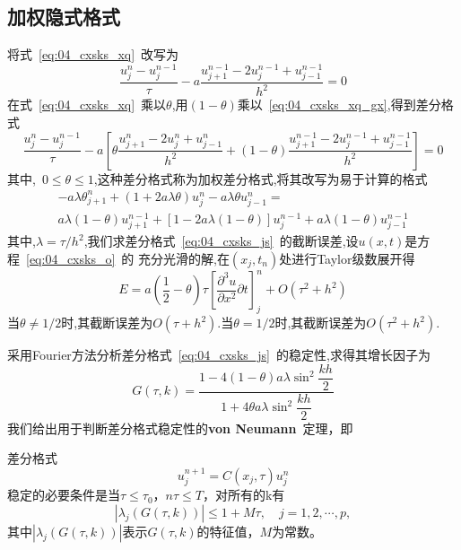 \subsection{加权隐式格式}
将式~\eqref{eq:04_cxsks_xq}~改写为
\begin{equation}\label{eq:04_cxsks_xq_gx}
 \dfrac{u_j^n-u_j^{n-1}}{\tau}-a\dfrac{u_{j+1}^{n-1}-2u_{j}^{n-1}+u_{j-1}^{n-1}}{h^2}=0
\end{equation}
在式~\eqref{eq:04_cxsks_xq}~乘以$\theta$,用$(1-\theta)$乘以~\eqref{eq:04_cxsks_xq_gx},得到差分格式
\begin{equation}\label{eq:04_cxsks_js}
 \dfrac{u_j^n-u_j^{n-1}}{\tau}-a\left[\theta\dfrac{u_{j+1}^n-2u_j^n+u_{j-1}^n}{h^2}
 +(1-\theta)\dfrac{u_{j+1}^{n-1}-2u_j^{n-1}+u_{j-1}^{n-1}}{h^2}\right]=0
\end{equation}
其中,~$0\leq\theta\leq 1$,这种差分格式称为加权差分格式,将其改写为易于计算的格式
\begin{multline}
 -a\lambda\theta_{j+1}^n+(1+2a\lambda\theta)u_j^n-a\lambda\theta u_{j-1}^n = \\
 a\lambda(1-\theta)u_{j+1}^{n-1}+[1-2a\lambda(1-\theta)]u_j^{n-1}+a\lambda(1-\theta)u_{j-1}^{n-1}
\end{multline}
其中,$\lambda=\tau/h^2$,我们求差分格式~\eqref{eq:04_cxsks_js}~的截断误差,设$u(x,t)$是方程~\eqref{eq:04_cxsks_o}~的
充分光滑的解,在$(x_j,t_n)$处进行Taylor级数展开得
\begin{equation*}
E=a\left(\dfrac{1}{2}-\theta\right)\tau\left[\dfrac{\partial^3 u}{\partial x^2}{\partial t}\right]_j^n
+O(\tau^2+h^2)
\end{equation*}
当$\theta\not=1/2$时,其截断误差为$O(\tau+h^2)$.当$\theta=1/2$时,其截断误差为$O(\tau^2+h^2)$.\par
采用Fourier方法分析差分格式~\eqref{eq:04_cxsks_js}~的稳定性,求得其增长因子为
\begin{equation}
 G(\tau,k)=\dfrac{1-4(1-\theta)a\lambda\sin^2\dfrac{kh}{2}}{1+4\theta a\lambda\sin^2\dfrac{kh}{2}}
\end{equation}
我们给出用于判断差分格式稳定性的\textbf{von Neumann}~定理，即
\begin{Theorem}
差分格式
\begin{equation}
	u^{n+1}_j=C(x_j,\tau)u^n_j
\end{equation}
稳定的必要条件是当$\tau\leq\tau_0$，$n\tau\leq T$，对所有的k有
\begin{equation}
	\left|\lambda_j(G(\tau,k))\right| \leq 1+M\tau,\quad j=1,2,\cdots,p,
\end{equation}
其中$\left|\lambda_j(G(\tau,k))\right|$表示$G(\tau,k)$的特征值，$M$为常数。
\end{Theorem}\par
